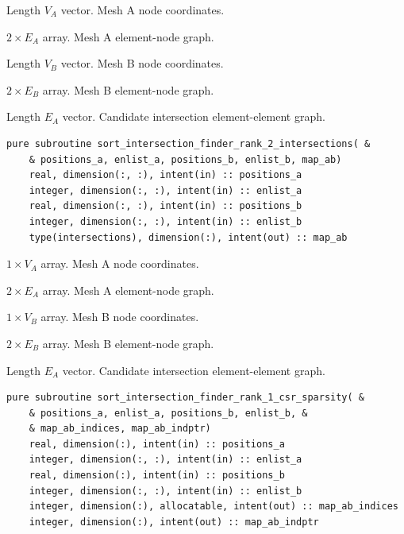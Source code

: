 \documentclass{article}
\begin{document}
\begin{description}[font=\ttfamily\bfseries,leftmargin=2.2\parindent,labelindent=1.7\parindent,noitemsep]
  \item[positions\_a] Length $V_A$ vector. Mesh A node coordinates.
  \item[enlist\_a] $2 \times E_A$ array. Mesh A element-node graph.
  \item[positions\_b] Length $V_B$ vector. Mesh B node coordinates.
  \item[enlist\_b] $2 \times E_B$ array. Mesh B element-node graph.
  \item[map\_ab] Length $E_A$ vector. Candidate intersection element-element
    graph.
\end{description}

\begin{lstlisting}[language=FORTRAN]
  pure subroutine sort_intersection_finder_rank_2_intersections( &
    & positions_a, enlist_a, positions_b, enlist_b, map_ab)
    real, dimension(:, :), intent(in) :: positions_a
    integer, dimension(:, :), intent(in) :: enlist_a
    real, dimension(:, :), intent(in) :: positions_b
    integer, dimension(:, :), intent(in) :: enlist_b
    type(intersections), dimension(:), intent(out) :: map_ab
\end{lstlisting}

\begin{description}[font=\ttfamily\bfseries,leftmargin=2.2\parindent,labelindent=1.7\parindent,noitemsep]
  \item[positions\_a] $1 \times V_A$ array. Mesh A node coordinates.
  \item[enlist\_a] $2 \times E_A$ array. Mesh A element-node graph.
  \item[positions\_b] $1 \times V_B$ array. Mesh B node coordinates.
  \item[enlist\_b] $2 \times E_B$ array. Mesh B element-node graph.
  \item[map\_ab] Length $E_A$ vector. Candidate intersection element-element
    graph.
\end{description}

\begin{lstlisting}[language=FORTRAN]
  pure subroutine sort_intersection_finder_rank_1_csr_sparsity( &
    & positions_a, enlist_a, positions_b, enlist_b, &
    & map_ab_indices, map_ab_indptr)
    real, dimension(:), intent(in) :: positions_a
    integer, dimension(:, :), intent(in) :: enlist_a
    real, dimension(:), intent(in) :: positions_b
    integer, dimension(:, :), intent(in) :: enlist_b
    integer, dimension(:), allocatable, intent(out) :: map_ab_indices
    integer, dimension(:), intent(out) :: map_ab_indptr
\end{lstlisting}
\end{document}
